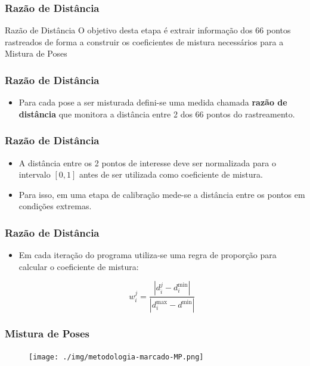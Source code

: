 \documentclass[brazil]{beamer}
\begin{document}
\begin{frame}
\frametitle{Razão de Distância}

\begin{block}{Razão de Distância}
  O objetivo desta etapa é extrair informação dos 66 pontos rastreados de forma
  a construir os coeficientes de mistura necessários para a Mistura de Poses
\end{block}

\end{frame}

\begin{frame}
\frametitle{Razão de Distância}
  \begin{itemize}

      \item Para cada pose a ser misturada defini-se uma medida chamada
        \textbf{razão de distância} que monitora a distância entre 2 dos 66
        pontos do rastreamento.

  \end{itemize} 
\end{frame}

\begin{frame}
\frametitle{Razão de Distância}
  \begin{itemize}
      \item A distância entre os 2 pontos de interesse deve ser normalizada 
        para o intervalo $[0, 1]$ antes de ser utilizada como coeficiente de
        mistura.

      \item Para isso, em uma etapa de calibração mede-se a distância entre os pontos em
        condições extremas.
  \end{itemize} 
\end{frame}

\begin{frame}
\frametitle{Razão de Distância}
  \begin{itemize}
      \item Em cada iteração do programa utiliza-se uma regra de proporção para
        calcular o coeficiente de mistura:

\begin{equation}
	w_i^j = \frac{|d_i^j - d_i^{\text{min}}|}{|d_i^{\text{max}} - d^{\text{min}}|}
   \label{eq:pesos1}
\end{equation}

  \end{itemize} 
\end{frame}

\begin{frame}
\frametitle{Mistura de Poses}
        \begin{figure}
            \centering
            \texttt{[image: ./img/metodologia-marcado-MP.png]}
      \end{figure}
\end{frame}
\end{document}
